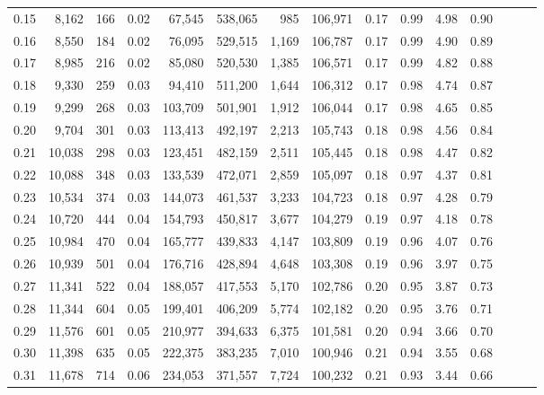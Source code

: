 \begin{tabular}{rrrrrrrrrrrrrrr}
0.15 &   8,162 &    166 &  0.02 &   67,545 &  538,065 &      985 &  106,971 &  0.17 &  0.99 &  4.98 &      0.90 \\
0.16 &   8,550 &    184 &  0.02 &   76,095 &  529,515 &    1,169 &  106,787 &  0.17 &  0.99 &  4.90 &      0.89 \\
0.17 &   8,985 &    216 &  0.02 &   85,080 &  520,530 &    1,385 &  106,571 &  0.17 &  0.99 &  4.82 &      0.88 \\
0.18 &   9,330 &    259 &  0.03 &   94,410 &  511,200 &    1,644 &  106,312 &  0.17 &  0.98 &  4.74 &      0.87 \\
0.19 &   9,299 &    268 &  0.03 &  103,709 &  501,901 &    1,912 &  106,044 &  0.17 &  0.98 &  4.65 &      0.85 \\
0.20 &   9,704 &    301 &  0.03 &  113,413 &  492,197 &    2,213 &  105,743 &  0.18 &  0.98 &  4.56 &      0.84 \\
0.21 &  10,038 &    298 &  0.03 &  123,451 &  482,159 &    2,511 &  105,445 &  0.18 &  0.98 &  4.47 &      0.82 \\
0.22 &  10,088 &    348 &  0.03 &  133,539 &  472,071 &    2,859 &  105,097 &  0.18 &  0.97 &  4.37 &      0.81 \\
0.23 &  10,534 &    374 &  0.03 &  144,073 &  461,537 &    3,233 &  104,723 &  0.18 &  0.97 &  4.28 &      0.79 \\
0.24 &  10,720 &    444 &  0.04 &  154,793 &  450,817 &    3,677 &  104,279 &  0.19 &  0.97 &  4.18 &      0.78 \\
0.25 &  10,984 &    470 &  0.04 &  165,777 &  439,833 &    4,147 &  103,809 &  0.19 &  0.96 &  4.07 &      0.76 \\
0.26 &  10,939 &    501 &  0.04 &  176,716 &  428,894 &    4,648 &  103,308 &  0.19 &  0.96 &  3.97 &      0.75 \\
0.27 &  11,341 &    522 &  0.04 &  188,057 &  417,553 &    5,170 &  102,786 &  0.20 &  0.95 &  3.87 &      0.73 \\
0.28 &  11,344 &    604 &  0.05 &  199,401 &  406,209 &    5,774 &  102,182 &  0.20 &  0.95 &  3.76 &      0.71 \\
0.29 &  11,576 &    601 &  0.05 &  210,977 &  394,633 &    6,375 &  101,581 &  0.20 &  0.94 &  3.66 &      0.70 \\
0.30 &  11,398 &    635 &  0.05 &  222,375 &  383,235 &    7,010 &  100,946 &  0.21 &  0.94 &  3.55 &      0.68 \\
0.31 &  11,678 &    714 &  0.06 &  234,053 &  371,557 &    7,724 &  100,232 &  0.21 &  0.93 &  3.44 &      0.66 \\

\end{tabular}
